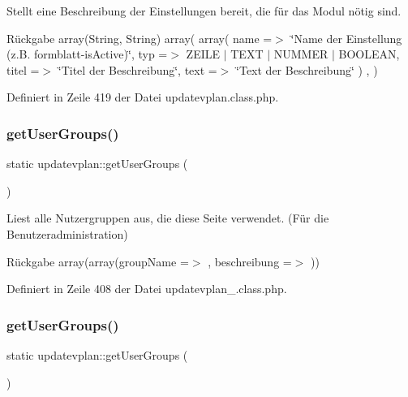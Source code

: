Stellt eine Beschreibung der Einstellungen bereit, die für das Modul nötig sind. \begin{DoxyReturn}{Rückgabe}
array(\+String, String) array( array( \textquotesingle{}name\textquotesingle{} =$>$ \char`\"{}\+Name der Einstellung (z.\+B. formblatt-\/is\+Active)\char`\"{}, \textquotesingle{}typ\textquotesingle{} =$>$ Z\+E\+I\+LE $\vert$ T\+E\+XT $\vert$ N\+U\+M\+M\+ER $\vert$ B\+O\+O\+L\+E\+AN, \textquotesingle{}titel\textquotesingle{} =$>$ \char`\"{}\+Titel der Beschreibung\char`\"{}, \textquotesingle{}text\textquotesingle{} =$>$ \char`\"{}\+Text der Beschreibung\char`\"{} ) , ) 
\end{DoxyReturn}


Definiert in Zeile 419 der Datei updatevplan.\+class.\+php.

\mbox{\label{classupdatevplan_a45d93d2df17784033ec72a19546ccaac}} 
\subsubsection{\texorpdfstring{get\+User\+Groups()}{getUserGroups()}\hspace{0.1cm}{\footnotesize\ttfamily [1/2]}}
{\footnotesize\ttfamily static updatevplan\+::get\+User\+Groups (\begin{DoxyParamCaption}{ }\end{DoxyParamCaption})\hspace{0.3cm}{\ttfamily [static]}}

Liest alle Nutzergruppen aus, die diese Seite verwendet. (Für die Benutzeradministration) \begin{DoxyReturn}{Rückgabe}
array(array(\textquotesingle{}group\+Name\textquotesingle{} =$>$ \textquotesingle{}\textquotesingle{}, \textquotesingle{}beschreibung\textquotesingle{} =$>$ \textquotesingle{}\textquotesingle{})) 
\end{DoxyReturn}


Definiert in Zeile 408 der Datei updatevplan\+\_\+.\+class.\+php.

\mbox{\label{classupdatevplan_a45d93d2df17784033ec72a19546ccaac}} 
\subsubsection{\texorpdfstring{get\+User\+Groups()}{getUserGroups()}\hspace{0.1cm}{\footnotesize\ttfamily [2/2]}}
{\footnotesize\ttfamily static updatevplan\+::get\+User\+Groups (\begin{DoxyParamCaption}{ }\end{DoxyParamCaption})\hspace{0.3cm}{\ttfamily [static]}}

